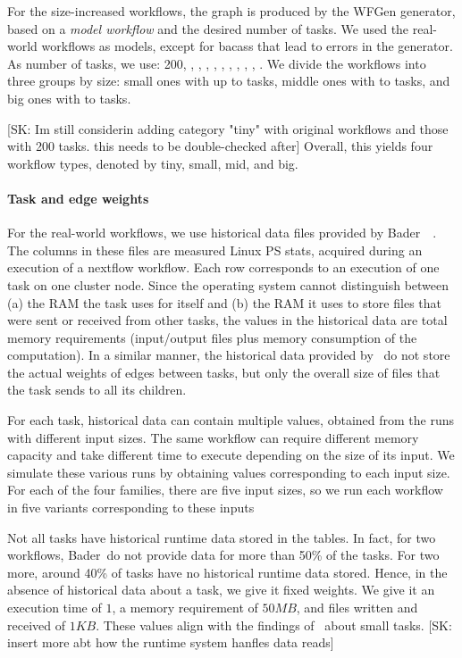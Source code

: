 \documentclass[conference]{IEEEtran}
\newcommand{\skug}[1]{{\color{blue}[SK: #1]}}
\begin{document}
    For the size-increased workflows, the graph is produced by the WFGen generator, based on a {\em model workflow} and
    the desired number of tasks.
    We used the real-world workflows as models, except for bacass that lead to errors in the generator.
%
    As number of tasks, we use: 200, , , , , ,
    , , , , .
    We divide the workflows into three groups by size: small ones with up to  tasks, middle
    ones with  to  tasks, and big ones with  to  tasks.

    \skug{Im still considerin adding category "tiny" with original workflows and those with 200 tasks. this needs to be double-checked after}
    Overall, this yields four workflow types, denoted by tiny, small, mid, and big.

    \paragraph{Task and edge weights}
    For the real-world workflows, we use historical data files provided by Bader~\etal~\cite{lotaru}.
    The columns in these files are measured Linux PS stats, acquired during an execution of a nextflow workflow.
    Each row corresponds to an execution of one task on one cluster node.
    Since the operating system cannot distinguish between (a) the RAM the task uses for itself and (b) the RAM it uses
    to store files that were sent or received from other tasks, the values in the historical data are total memory requirements (input/output files plus memory consumption of the computation).
    In a similar manner, the historical data provided by~\cite{lotaru} do not store the actual weights of edges between tasks, but only the overall
    size of files that the task sends to all its children.

    For each task, historical data can contain multiple values, obtained from the runs with different input sizes.
    The same workflow can require different memory capacity and take different time to execute
    depending on the size of its input.
    We simulate these various runs by obtaining values corresponding to each input size.
    For each of the four families, there are five input sizes, so we run each workflow in five variants corresponding to these inputs

    Not all tasks have historical runtime data stored in the tables.
    In fact, for two workflows, Bader~\etal do not provide data for more than 50\% of the tasks.
    For two more, around 40\% of tasks have no historical runtime data stored.
    Hence, in the absence of historical data about a task, we give it fixed weights.
    We give it an execution time of $1$, a memory requirement of $50 MB$, and files written and received of $1KB$.
    These values align with the findings of~\cite{lotaru} about small tasks.
%
    \skug{insert more abt how the runtime system hanfles data reads}
\end{document}
